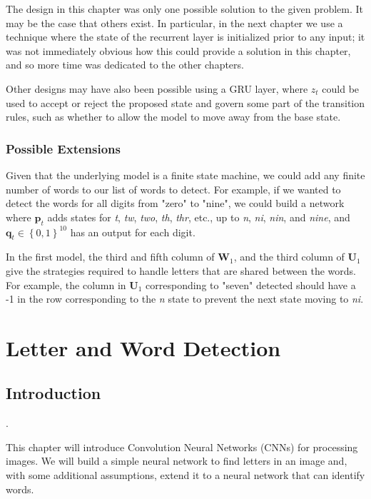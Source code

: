 \documentclass{somasmsc}
\begin{document}
The design in this chapter was only one possible solution to the given problem. It may be the case that others exist. In particular, in the next chapter we use a technique where the state of the recurrent layer is initialized prior to any input; it was not immediately obvious how this could provide a solution in this chapter, and so more time was dedicated to the other chapters.

Other designs may have also been possible using a GRU layer, where $z_t$ could be used to accept or reject the proposed state and govern some part of the transition rules, such as whether to allow the model to move away from the base state.

\subsection{Possible Extensions}

Given that the underlying model is a finite state machine, we could add any finite number of words to our list of words to detect. For example, if we wanted to detect the words for all digits from "zero" to "nine", we could build a network where $\pmb{p}_t$ adds states for \textit{t}, \textit{tw}, \textit{two}, \textit{th}, \textit{thr}, etc., up to \textit{n}, \textit{ni}, \textit{nin}, and \textit{nine}, and $\pmb{q}_t \in \left\{0,1\right\}^{10}$ has an output for each digit.

In the first model, the third and fifth column of $\mathbf{W}_1$, and the third column of $\mathbf{U}_1$ give the strategies required to handle letters that are shared between the words. For example, the column in $\mathbf{U}_1$ corresponding to "seven" detected should have a -1 in the row corresponding to the \textit{n} state to prevent the next state moving to \textit{ni}.





\chapter{Letter and Word Detection}

\section{Introduction}\label{letters:intro}.

This chapter will introduce Convolution Neural Networks (CNNs) for processing images. We will build a simple neural network to find letters in an image and, with some additional assumptions, extend it to a neural network that can identify words.
\end{document}
